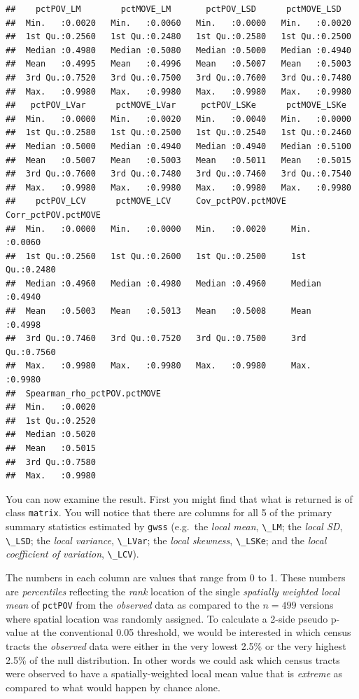 \documentclass[
]{book}
\newcommand{\passthrough}[1]{#1}
\begin{document}
\begin{lstlisting}
##    pctPOV_LM        pctMOVE_LM       pctPOV_LSD      pctMOVE_LSD    
##  Min.   :0.0020   Min.   :0.0060   Min.   :0.0000   Min.   :0.0020  
##  1st Qu.:0.2560   1st Qu.:0.2480   1st Qu.:0.2580   1st Qu.:0.2500  
##  Median :0.4980   Median :0.5080   Median :0.5000   Median :0.4940  
##  Mean   :0.4995   Mean   :0.4996   Mean   :0.5007   Mean   :0.5003  
##  3rd Qu.:0.7520   3rd Qu.:0.7500   3rd Qu.:0.7600   3rd Qu.:0.7480  
##  Max.   :0.9980   Max.   :0.9980   Max.   :0.9980   Max.   :0.9980  
##   pctPOV_LVar      pctMOVE_LVar     pctPOV_LSKe      pctMOVE_LSKe   
##  Min.   :0.0000   Min.   :0.0020   Min.   :0.0040   Min.   :0.0000  
##  1st Qu.:0.2580   1st Qu.:0.2500   1st Qu.:0.2540   1st Qu.:0.2460  
##  Median :0.5000   Median :0.4940   Median :0.4940   Median :0.5100  
##  Mean   :0.5007   Mean   :0.5003   Mean   :0.5011   Mean   :0.5015  
##  3rd Qu.:0.7600   3rd Qu.:0.7480   3rd Qu.:0.7460   3rd Qu.:0.7540  
##  Max.   :0.9980   Max.   :0.9980   Max.   :0.9980   Max.   :0.9980  
##    pctPOV_LCV      pctMOVE_LCV     Cov_pctPOV.pctMOVE Corr_pctPOV.pctMOVE
##  Min.   :0.0000   Min.   :0.0000   Min.   :0.0020     Min.   :0.0060     
##  1st Qu.:0.2560   1st Qu.:0.2600   1st Qu.:0.2500     1st Qu.:0.2480     
##  Median :0.4960   Median :0.4980   Median :0.4960     Median :0.4940     
##  Mean   :0.5003   Mean   :0.5013   Mean   :0.5008     Mean   :0.4998     
##  3rd Qu.:0.7460   3rd Qu.:0.7520   3rd Qu.:0.7500     3rd Qu.:0.7560     
##  Max.   :0.9980   Max.   :0.9980   Max.   :0.9980     Max.   :0.9980     
##  Spearman_rho_pctPOV.pctMOVE
##  Min.   :0.0020             
##  1st Qu.:0.2520             
##  Median :0.5020             
##  Mean   :0.5015             
##  3rd Qu.:0.7580             
##  Max.   :0.9980
\end{lstlisting}

You can now examine the result. First you might find that what is returned is of class \passthrough{\lstinline!matrix!}. You will notice that there are columns for all 5 of the primary summary statistics estimated by \passthrough{\lstinline!gwss!} (e.g.~the \emph{local mean}, \passthrough{\lstinline!\_LM!}; the \emph{local SD}, \passthrough{\lstinline!\_LSD!}; the \emph{local variance}, \passthrough{\lstinline!\_LVar!}; the \emph{local skewness}, \passthrough{\lstinline!\_LSKe!}; and the \emph{local coefficient of variation}, \passthrough{\lstinline!\_LCV!}).

The numbers in each column are values that range from 0 to 1. These numbers are \emph{percentiles} reflecting the \emph{rank} location of the single \emph{spatially weighted local mean} of \passthrough{\lstinline!pctPOV!} from the \emph{observed} data as compared to the \(n=499\) versions where spatial location was randomly assigned. To calculate a 2-side pseudo p-value at the conventional 0.05 threshold, we would be interested in which census tracts the \emph{observed} data were either in the very lowest 2.5\% or the very highest 2.5\% of the null distribution. In other words we could ask which census tracts were observed to have a spatially-weighted local mean value that is \emph{extreme} as compared to what would happen by chance alone.
\end{document}
